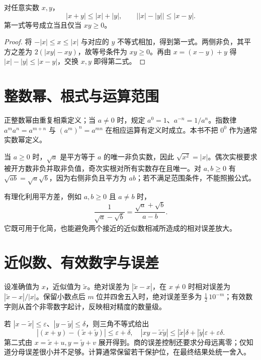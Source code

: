 \documentclass[UTF8]{ctexbook}
\begin{document}
\begin{theorem}[三角不等式与反三角不等式]
对任意实数 $x,y$，
\[
 |x+y|\le |x|+|y|,\qquad
 \bigl||x|-|y|\bigr|\le |x-y|.
\]
第一式等号成立当且仅当 $xy\ge0$。
\end{theorem}
\begin{proof}
将 $-|x|\le x\le|x|$ 与对应的 $y$ 不等式相加，得到第一式。两侧非负，其平方之差为 $2(|xy|-xy)$，故等号条件为 $xy\ge0$。再由 $x=(x-y)+y$ 得 $|x|-|y|\le|x-y|$，交换 $x,y$ 即得第二式。
\end{proof}

\section{整数幂、根式与运算范围}
正整数幂由重复相乘定义；当 $a\ne0$ 时，规定 $a^0=1$、$a^{-n}=1/a^n$。指数律 $a^ma^n=a^{m+n}$ 与 $(a^m)^n=a^{mn}$ 在相应运算有定义时成立。本书不把 $0^0$ 作为通常实数幂定义。

当 $a\ge0$ 时，$\sqrt a$ 是平方等于 $a$ 的唯一非负实数，因此 $\sqrt{x^2}=|x|$。偶次实根要求被开方数非负并取非负值，奇次实根对所有实数存在且唯一。对 $a,b\ge0$ 有 $\sqrt{ab}=\sqrt a\sqrt b$，因为右侧非负且平方为 $ab$；若不满足范围条件，不能照搬公式。

有理化利用平方差，例如 $a,b\ge0$ 且 $a\ne b$ 时，
\[
 \frac1{\sqrt a-\sqrt b}=\frac{\sqrt a+\sqrt b}{a-b}.
\]
它既可用于化简，也能避免两个接近的近似数相减所造成的相对误差放大。

\section{近似数、有效数字与误差}
设准确值为 $x$，近似值为 $\widetilde x$。绝对误差为 $|\widetilde x-x|$，在 $x\ne0$ 时相对误差为 $|\widetilde x-x|/|x|$。保留小数点后 $m$ 位并四舍五入时，绝对误差至多为 $\frac12\,10^{-m}$；有效数字则从首个非零数字起计，反映相对精度的数量级。

若 $|x-\widetilde x|\le\varepsilon$、$|y-\widetilde y|\le\delta$，则三角不等式给出
\[
 |(x+y)-(\widetilde x+\widetilde y)|\le\varepsilon+\delta,
 \quad
 |xy-\widetilde x\widetilde y|
 \le|\widetilde x|\delta+|\widetilde y|\varepsilon+\varepsilon\delta.
\]
第二式由 $x=\widetilde x+u,y=\widetilde y+v$ 展开得到。商的误差控制还要求分母远离零；仅知道分母误差很小并不足够。计算通常保留若干保护位，在最终结果处统一舍入。
\end{document}

